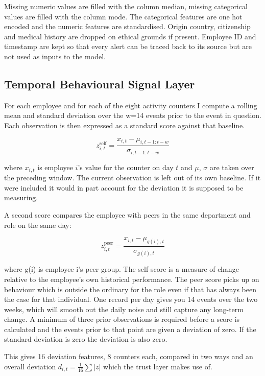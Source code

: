 \documentclass[a4paper,12pt]{article}
\begin{document}
Missing numeric values are filled with the column median, missing categorical values are filled with the column mode. The categorical features are one hot encoded and the numeric features are standardised. Origin country, citizenship and medical history are dropped on ethical grounds if present. Employee ID and timestamp are kept so that every alert can be traced back to its source but are not used as inputs to the model.

\subsection{Temporal Behavioural Signal Layer}
\label{sec:6.3}

For each employee and for each of the eight activity counters I compute a rolling mean and standard deviation over the w=14 events prior to the event in question. Each observation is then expressed as a standard score against that baseline.

\begin{equation}
z^{\text{self}}_{i,t} = \frac{x_{i,t} - \mu_{i,t-1:t-w}}{\sigma_{i,t-1:t-w}}
\end{equation}

where $x_{i,t}$ is employee $i$'s value for the counter on day $t$ and $\mu$, $\sigma$ are taken over the preceding window. The current observation is left out of its own baseline. If it were included it would in part account for the deviation it is supposed to be measuring.

A second score compares the employee with peers in the same department and role on the same day:

\begin{equation}
z^{\text{peer}}_{i,t} = \frac{x_{i,t} - \mu_{g(i),t}}{\sigma_{g(i),t}}
\end{equation}

where g(i) is employee i's peer group. The self score is a measure of change relative to the employee's own historical performance. The peer score picks up on behaviour which is outside the ordinary for the role even if that has always been the case for that individual. One record per day gives you 14 events over the two weeks, which will smooth out the daily noise and still capture any long-term change. A minimum of three prior observations is required before a score is calculated and the events prior to that point are given a deviation of zero. If the standard deviation is zero the deviation is also zero.

This gives 16 deviation features, 8 counters each, compared in two ways and an overall deviation $d_{i,t} = \frac{1}{16}\sum |z|$ which the trust layer makes use of.
\end{document}
